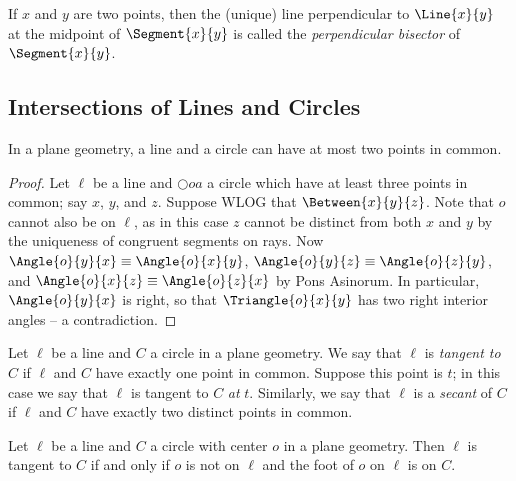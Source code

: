 \documentclass{article}
\begin{document}
\begin{dfn}
If $x$ and $y$ are two points, then the (unique) line perpendicular to $\Line{x}{y}$ at the midpoint of $\Segment{x}{y}$ is called the \emph{perpendicular bisector} of $\Segment{x}{y}$.
\end{dfn}

\subsection*{Intersections of Lines and Circles}

\begin{prop}
In a plane geometry, a line and a circle can have at most two points in common.
\end{prop}

\begin{proof}
Let $\ell$ be a line and $\Circle{o}{a}$ a circle which have at least three points in common; say $x$, $y$, and $z$. Suppose WLOG that $\Between{x}{y}{z}$. Note that $o$ cannot also be on $\ell$, as in this case $z$ cannot be distinct from both $x$ and $y$ by the uniqueness of congruent segments on rays. Now $\Angle{o}{y}{x} \equiv \Angle{o}{x}{y}$, $\Angle{o}{y}{z} \equiv \Angle{o}{z}{y}$, and $\Angle{o}{x}{z} \equiv \Angle{o}{z}{x}$ by Pons Asinorum. In particular, $\Angle{o}{y}{x}$ is right, so that $\Triangle{o}{x}{y}$ has two right interior angles -- a contradiction.
\end{proof}

\begin{dfn}
Let $\ell$ be a line and $C$ a circle in a plane geometry. We say that $\ell$ is \emph{tangent to} $C$ if $\ell$ and $C$ have exactly one point in common. Suppose this point is $t$; in this case we say that $\ell$ is tangent to $C$ \emph{at} $t$. Similarly, we say that $\ell$ is a \emph{secant} of $C$ if $\ell$ and $C$ have exactly two distinct points in common.
\end{dfn}

\begin{prop}
Let $\ell$ be a line and $C$ a circle with center $o$ in a plane geometry. Then $\ell$ is tangent to $C$ if and only if $o$ is not on $\ell$ and the foot of $o$ on $\ell$ is on $C$.
\end{prop}
\end{document}
